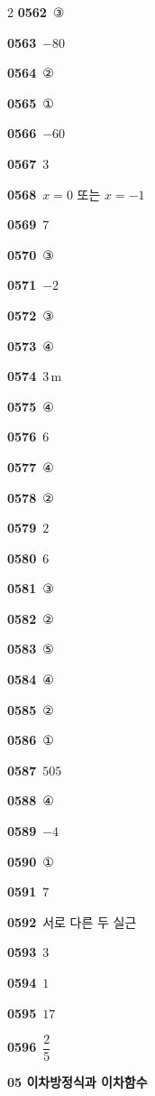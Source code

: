 \documentclass[10pt,a4paper]{article}
\begin{document}
\begin{multicols}{2}
\noindent\textbf{0562}\ ③\par
\noindent\textbf{0563}\ $-80$\par
\noindent\textbf{0564}\ ②\par
\noindent\textbf{0565}\ ①\par
\noindent\textbf{0566}\ $-60$\par
\noindent\textbf{0567}\ $3$\par
\noindent\textbf{0568}\ $x=0$ 또는 $x=-1$\par
\noindent\textbf{0569}\ $7$\par
\noindent\textbf{0570}\ ③\par
\noindent\textbf{0571}\ $-2$\par
\noindent\textbf{0572}\ ③\par
\noindent\textbf{0573}\ ④\par
\noindent\textbf{0574}\ $3\,\mathrm{m}$\par
\noindent\textbf{0575}\ ④\par
\noindent\textbf{0576}\ $6$\par
\noindent\textbf{0577}\ ④\par
\noindent\textbf{0578}\ ②\par
\noindent\textbf{0579}\ $2$\par
\noindent\textbf{0580}\ $6$\par
\noindent\textbf{0581}\ ③\par
\noindent\textbf{0582}\ ②\par
\noindent\textbf{0583}\ ⑤\par
\noindent\textbf{0584}\ ④\par
\noindent\textbf{0585}\ ②\par
\noindent\textbf{0586}\ ①\par
\noindent\textbf{0587}\ $505$\par
\noindent\textbf{0588}\ ④\par
\noindent\textbf{0589}\ $-4$\par
\noindent\textbf{0590}\ ①\par
\noindent\textbf{0591}\ $7$\par
\noindent\textbf{0592}\ 서로 다른 두 실근\par
\noindent\textbf{0593}\ $3$\par
\noindent\textbf{0594}\ $1$\par
\noindent\textbf{0595}\ $17$\par
\noindent\textbf{0596}\ $\dfrac{2}{5}$\par
\noindent\textbf{05 이차방정식과 이차함수}\par\smallskip

\end{multicols}
\end{document}
